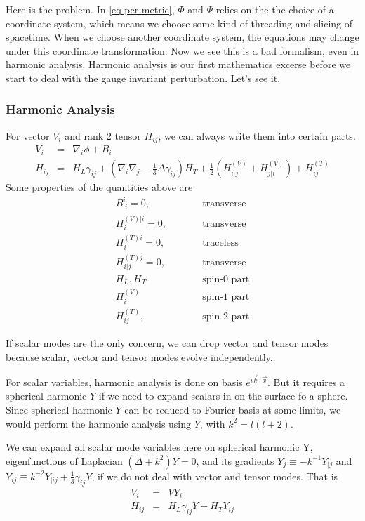 \documentclass[12pt,a4paper]{book}
\begin{document}
Here is the problem. In \ref{eq-per-metric}, $\Phi$ and $\Psi$ relies on the the choice of a coordinate system, which means we choose some kind of threading and slicing of spacetime. When we choose another coordinate system, the equations may change under this coordinate transformation. Now we see this is a bad formalism, even in harmonic analysis. Harmonic analysis is our first mathematics excerse before we start to deal with the gauge invariant perturbation. Let's see it.

\subsubsection{Harmonic Analysis}

For vector $V_i$ and rank 2 tensor $H_{ij}$, we can always write them into certain parts.
\begin{eqnarray}
	V_i &=& \nabla_i \phi + B_i\\
	H_{ij} &=& H_L \gamma_{ij} + \left(\nabla_i\nabla_j - \frac{1}{3}\Delta\gamma_{ij}\right) H_{T} + \frac{1}{2}\left(H^{(V)}_{i|j} + H^{(V)}_{j|i} \right) + H^{(T)}_{ij}
\end{eqnarray}
Some properties of the quantities above are
\begin{eqnarray}
	B^i_{|i}=0, &&\qquad\text{transverse} \\
	H^{(V)|i}_i = 0, &&\qquad\text{transverse} \\
	H^{(T)i}_i = 0,&&\qquad \text{traceless} \\
	H^{(T)j}_{i|j} = 0, &&\qquad \text{transverse} \\
	H_L, H_T  &&\qquad \text{spin-0 part} \\
	H^{(V)}_i  	&&\qquad \text{spin-1 part} \\
	H^{(T)}_{ij}, &&\qquad \text{spin-2 part}
\end{eqnarray}


If scalar modes are the only concern, we can drop vector and tensor modes because scalar, vector and tensor modes evolve independently.


For scalar variables, harmonic analysis is done on basis $e^{i\vec k\cdot \vec x}$. But it requires a spherical harmonic $Y$ if we need to expand scalars in on the surface fo a sphere. Since spherical harmonic $Y$ can be reduced to Fourier basis at some limits, we would perform the harmonic analysis using $Y$, with $k^2=l(l+2)$.


We can expand all scalar mode variables here on spherical harmonic Y, eigenfunctions of Laplacian $(\Delta + k^2) Y =0$, and its gradients $Y_{j}\equiv -k^{-1} Y_{|j}$ and $Y_{ij}\equiv k^{-2}Y_{|ij} +\frac13\gamma_{ij}Y$, if we do not deal with vector and tensor modes. That is
\begin{eqnarray}
	V_i &=& V Y_i \\
	H_{ij} &=& H_L \gamma_{ij} Y + H_T Y_{ij}
\end{eqnarray}
\end{document}
